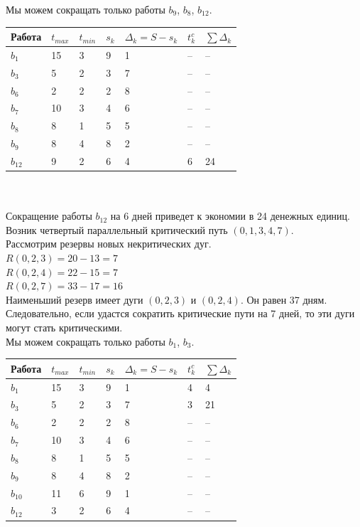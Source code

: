 \documentclass[a4paper, 12pt]{report}
\begin{document}
	Мы можем сокращать только работы $b_9$, $b_8$, $b_{12}$.\\
	\begin{tabular}{ |p{2cm}||p{1cm}||p{1cm}||p{1cm}||p{3cm}||p{2cm}||p{2cm}|}
		\hline
		Работа & $t_{max}$ & $t_{min}$ & $s_k$ & $\Delta_k=S-s_k$ & $t_k^c$& $\sum \Delta_k$\\
		\hline
		$b_1$ & 15 & 3 & 9 & 1 & -- & --\\
		$b_3$ & 5 & 2 & 3 & 7 & -- & --\\
		$b_6$ & 2 & 2 & 2 & 8 & --& --\\
		$b_7$&10&3&4&6& -- & --\\
		$b_8$ & 8 & 1 & 5 & 5 & -- & --\\
		$b_{9}$ & 8 & 4 & 8 & 2 & -- & -- \\
		$b_{12}$ & 9 & 2 & 6 & 4 & 6 & 24\\
		\hline
	\end{tabular}\\\\
	Сокращение работы $b_{12}$ на 6 дней приведет к экономии в 24 денежных единиц.
	Возник четвертый параллельный критический путь $(0, 1, 3, 4, 7)$.\\
	Рассмотрим резервы новых некритических дуг.\\
	$R(0,2,3)=20-13=7$\\
	$R(0,2,4)=22-15=7$\\
	$R(0,2,7)=33-17=16$\\
	Наименьший резерв имеет дуги $(0,2,3)$ и $(0,2,4)$. Он равен 37 дням. Следовательно, если удастся сократить критические пути на 7 дней, то эти дуги могут стать критическими.\\
	Мы можем сокращать только работы $b_1$, $b_3$.\\
	\begin{tabular}{ |p{2cm}||p{1cm}||p{1cm}||p{1cm}||p{3cm}||p{2cm}||p{2cm}|}
		\hline
		Работа & $t_{max}$ & $t_{min}$ & $s_k$ & $\Delta_k=S-s_k$ & $t_k^c$& $\sum \Delta_k$\\
		\hline
		$b_1$ & 15 & 3 & 9 & 1 & 4 & 4\\
		$b_3$ & 5 & 2 & 3 & 7 & 3 & 21\\
		$b_6$ & 2 & 2 & 2 & 8 & --& --\\
		$b_7$&10&3&4&6& -- & --\\
		$b_8$ & 8 & 1 & 5 & 5 & -- & --\\
		$b_{9}$ & 8 & 4 & 8 & 2 & -- & -- \\
		$b_{10}$&11&6&9&1&--&--\\
		$b_{12}$ & 3 & 2 & 6 & 4 & -- & --\\
		\hline
	\end{tabular}\\\\
\end{document}

